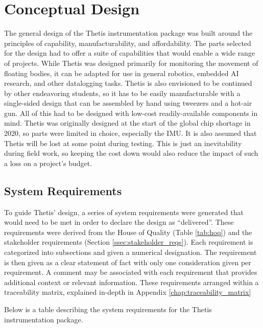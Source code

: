 \section{Conceptual Design} \label{sec:conceptual_design}
The general design of the Thetis instrumentation package was built around the principles of capability, manufacturability, and affordability.
The parts selected for the design had to offer a suite of capabilities that would enable a wide range of projects.
While Thetis was designed primarily for monitoring the movement of floating bodies, it can be adapted for use in general robotics, embedded AI research, and other datalogging tasks.
Thetis is also envisioned to be continued by other endeavoring students, so it has to be easily manufacturable with a single-sided design that can be assembled by hand using tweezers and a hot-air gun.
All of this had to be designed with low-cost readily-available components in mind.
Thetis was originally designed at the start of the global chip shortage in 2020, so parts were limited in choice, especially the IMU.
It is also assumed that Thetis will be lost at some point during testing.
This is just an inevitability during field work, so keeping the cost down would also reduce the impact of such a loss on a project's budget.

\subsection{System Requirements} \label{ssec:system_requirements}
To guide Thetis' design, a series of system requirements were generated that would need to be met in order to declare the design as ``delivered''.
These requirements were derived from the House of Quality (Table \ref{tab:hoq}) and the stakeholder requirements (Section \ref{ssec:stakeholder_reqs}).
Each requirement is categorized into subsections and given a numerical designation.
The requirement is then given as a clear statement of fact with only one consideration given per requirement.
A comment may be associated with each requirement that provides additional context or relevant information.
These requirements arranged within a traceability matrix, explained in-depth in Appendix \ref{chap:traceability_matrix}						

Below is a table describing the system requirements for the Thetis instrumentation package.



